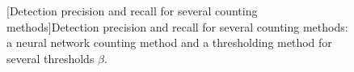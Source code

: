 \begin{figure}[t]
    \centering
    \begin{adjustbox}{width=1.1\textwidth,center}
    \end{adjustbox}
    [Detection precision and recall for several counting methods]{Detection precision and recall for several counting methods: a neural network counting method and a thresholding method for several thresholds $\beta$.}
    \label{fig:hybrid_nosPrediction_prediction}
\end{figure}

